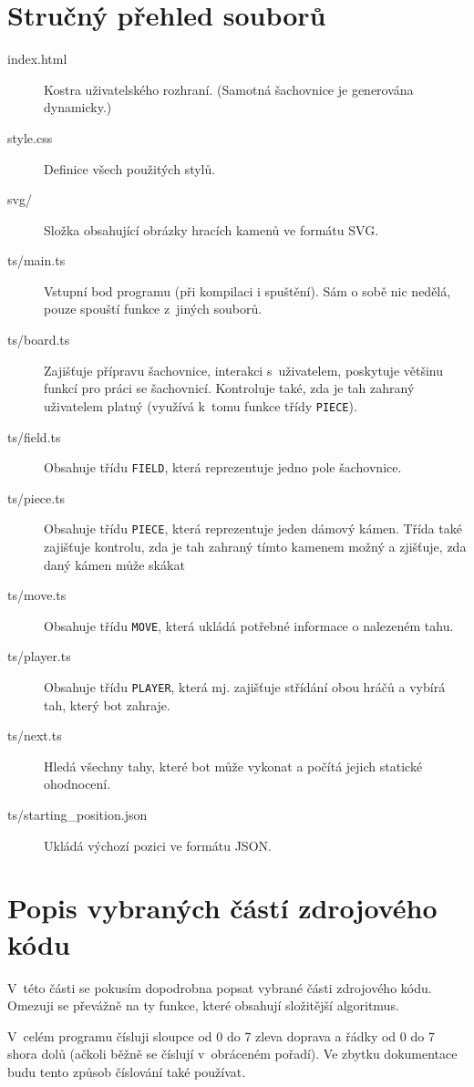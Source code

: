 \documentclass[a4paper,12pt]{article}
\begin{document}
	\section{Stručný přehled souborů}
	\begin{description}
		\item[index.html] Kostra uživatelského rozhraní. (Samotná šachovnice je generována dynamicky.)
		\item[style.css] Definice všech použitých stylů.
		\item[svg/] Složka obsahující obrázky hracích kamenů ve formátu SVG.
		\item[ts/main.ts] Vstupní bod programu (při kompilaci i spuštění). Sám o sobě nic nedělá, pouze spouští funkce 
			z~jiných souborů.
		\item[ts/board.ts] Zajišťuje přípravu šachovnice, interakci s~uživatelem, poskytuje většinu funkcí pro práci
		     se šachovnicí. Kontroluje také, zda je tah zahraný uživatelem platný (využívá k~tomu funkce třídy \texttt{PIECE}).
		\item[ts/field.ts] Obsahuje třídu \texttt{FIELD}, která reprezentuje jedno pole šachovnice.
		\item[ts/piece.ts] Obsahuje třídu \texttt{PIECE}, která reprezentuje jeden dámový kámen.
		    Třída také zajišťuje kontrolu, zda je tah zahraný tímto kamenem možný a zjišťuje, zda daný kámen může skákat
		\item[ts/move.ts] Obsahuje třídu \texttt{MOVE}, která ukládá potřebné informace o nalezeném tahu.
		\item[ts/player.ts] Obsahuje třídu \texttt{PLAYER}, která mj. zajišťuje střídání obou hráčů a vybírá tah, který bot zahraje.
		\item[ts/next.ts] Hledá všechny tahy, které bot může vykonat a počítá jejich statické ohodnocení.
		\item[ts/starting\_position.json] Ukládá výchozí pozici ve formátu JSON.
	\end{description}
	
	\section{Popis vybraných částí zdrojového kódu}
	V~této části se pokusím dopodrobna popsat vybrané části zdrojového kódu.
	Omezuji se převážně na ty funkce, které obsahují složitější algoritmus.
	
	V~celém programu čísluji sloupce od 0 do 7 zleva doprava a řádky od 0 do 7 shora dolů
	(ačkoli běžně se číslují v~obráceném pořadí). Ve zbytku dokumentace budu tento způsob
	číslování také používat.
	
\end{document}
